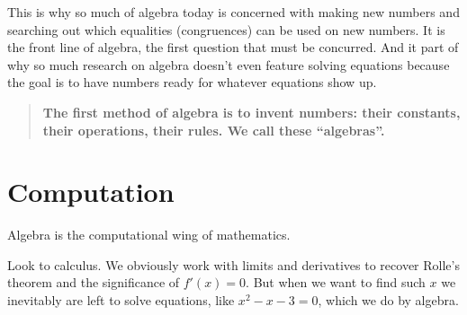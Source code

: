 This is why so much of algebra today is concerned with making new numbers and 
searching out which equalities (congruences) can be used on new numbers.  It is 
the front line of algebra, the first question that must be concurred.  And it part 
of why so much research on algebra doesn't even feature solving equations because 
the goal is to have numbers ready for whatever equations show up.

\begin{quote}
    \textbf{The first method of algebra is to invent numbers: their constants, their 
    operations, their rules.  We call these ``algebras''.}
\end{quote}

\section{Computation}
Algebra is the computational wing of mathematics.  

Look to calculus.
We obviously work with limits and derivatives to recover Rolle's theorem 
and the significance of $f'(x)=0$.  But when we want to find such $x$ we
inevitably are left to solve equations, like $x^2-x-3=0$, which we do by algebra.  

